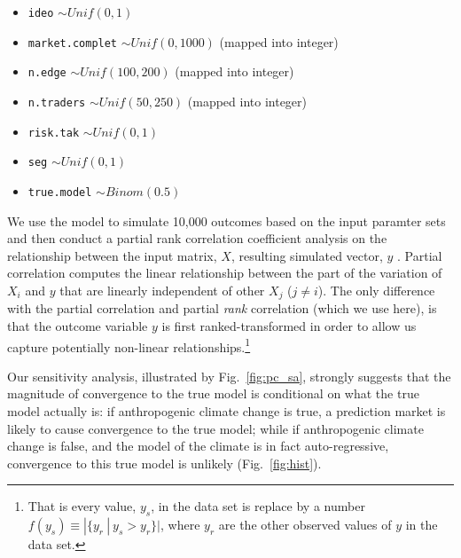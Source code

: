 \documentclass{article}\usepackage[]{graphicx}\usepackage[]{color}
\begin{document}
\begin{itemize}
	\item \texttt{ideo} $\sim Unif(0,1)$
	\item \texttt{market.complet} $\sim Unif(0,1000)$ (mapped into integer)
	\item  \texttt{n.edge} $\sim Unif(100,200)$ (mapped into integer)
	\item  \texttt{n.traders} $\sim Unif(50,250)$ (mapped into integer)
	\item \texttt{risk.tak}  $\sim Unif(0,1)$
	\item  \texttt{seg} $\sim Unif(0,1)$
	\item  \texttt{true.model} $\sim Binom(0.5)$
\end{itemize}

We use the model to simulate 10,000 outcomes based on the input paramter sets and then conduct a partial rank correlation coefficient analysis on the relationship between the input matrix, $X$, resulting simulated vector, $y$ \cite{Marino2008,pujol_sensitivity:_2014,saltelli_sensitivity_2009}. Partial correlation computes the linear relationship between the part of the variation of $X_i$ and $y$ that are linearly independent of other $X_j$  ($j \neq i$).  The only difference with the partial correlation and partial \emph{rank} correlation (which we use here), is that the outcome variable $y$ is first ranked-transformed in order to allow us capture potentially non-linear relationships.\footnote{That is every value, $y_s$, in the data set is replace by a number $f(y_s) \equiv |\{y_r~|~ y_s > y_r\}|$, where $y_r$ are the other observed values of $y$ in the data set.}

Our sensitivity analysis, illustrated by Fig.~\ref{fig:pc_sa}, strongly suggests that the magnitude of convergence to the true model is conditional on what the true model actually is: if anthropogenic climate change is true, a prediction market is likely to cause convergence to the true model; while if anthropogenic climate change is false, and the model of the climate is in fact auto-regressive, convergence to this true model is unlikely (Fig.~\ref{fig:hist}).
\end{document}
